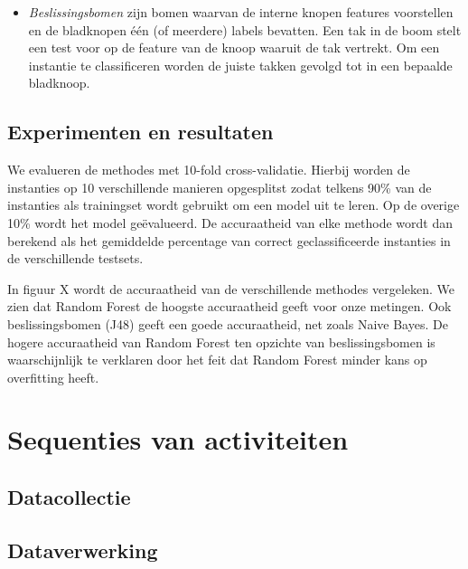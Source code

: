 \documentclass{article}
\begin{document}
\begin{itemize}
\item \textit{Beslissingsbomen} zijn bomen waarvan de interne knopen features voorstellen en de bladknopen \'e\'en (of meerdere) labels bevatten. Een tak in de boom stelt een test voor op de feature van de knoop waaruit de tak vertrekt. Om een instantie te classificeren worden de juiste takken gevolgd tot in een bepaalde bladknoop.
\end{itemize}


\subsection{Experimenten en resultaten}

We evalueren de methodes met 10-fold cross-validatie. Hierbij worden de instanties op 10 verschillende manieren opgesplitst zodat telkens 90\% van de instanties als trainingset wordt gebruikt om een model uit te leren. Op de overige 10\% wordt het model ge\"evalueerd. De accuraatheid van elke methode wordt dan berekend als het gemiddelde percentage van correct geclassificeerde instanties in de verschillende testsets.

In figuur X %
wordt de accuraatheid van de verschillende methodes vergeleken. We zien dat Random Forest de hoogste accuraatheid geeft voor onze metingen. Ook beslissingsbomen (J48) geeft een goede accuraatheid, net zoals Naive Bayes. De hogere accuraatheid van Random Forest ten opzichte van beslissingsbomen is waarschijnlijk te verklaren door het feit dat Random Forest minder kans op overfitting heeft. %



\section{Sequenties van activiteiten}


\subsection{Datacollectie}


\subsection{Dataverwerking}
\end{document}
